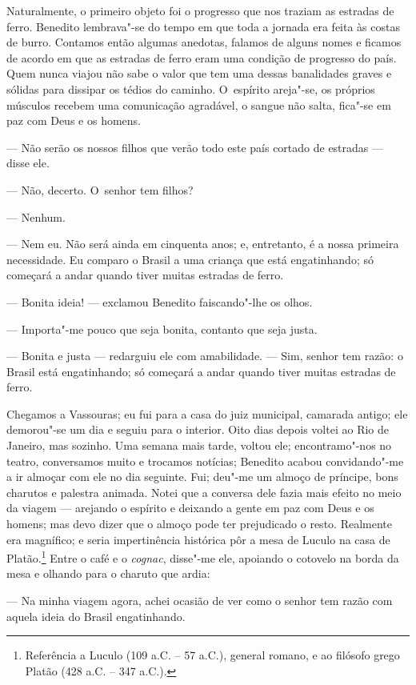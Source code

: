 \begin{linenumbers}
Naturalmente, o primeiro objeto foi o progresso que nos traziam as
estradas de ferro. Benedito lembrava"-se do tempo em que toda a jornada
era feita às costas de burro. Contamos então algumas anedotas, falamos
de alguns nomes e ficamos de acordo em que as estradas de ferro eram uma
condição de progresso do país. Quem nunca viajou não sabe o valor que
tem uma dessas banalidades graves e sólidas para dissipar os tédios do
caminho. O~espírito areja"-se, os próprios músculos recebem uma
comunicação agradável, o sangue não salta, fica"-se em paz com Deus e os
homens.

--- Não serão os nossos filhos que verão todo este país cortado de
estradas --- disse ele.

--- Não, decerto. O~senhor tem filhos?

--- Nenhum.

--- Nem eu. Não será ainda em cinquenta anos; e, entretanto, é a nossa
primeira necessidade. Eu comparo o Brasil a uma criança que está
engatinhando; só começará a andar quando tiver muitas estradas de ferro.

--- Bonita ideia! --- exclamou Benedito faiscando"-lhe os olhos.

--- Importa"-me pouco que seja bonita, contanto que seja justa.

--- Bonita e justa --- redarguiu ele com amabilidade. --- Sim, senhor tem
razão: o Brasil está engatinhando; só começará a andar quando tiver
muitas estradas de ferro.

Chegamos a Vassouras; eu fui para a casa do juiz municipal, camarada
antigo; ele demorou"-se um dia e seguiu para o interior. Oito dias depois
voltei ao Rio de Janeiro, mas sozinho. Uma semana mais tarde, voltou
ele; encontramo"-nos no teatro, conversamos muito e trocamos notícias;
Benedito acabou convidando"-me a ir almoçar com ele no dia seguinte. Fui;
deu"-me um almoço de príncipe, bons charutos e palestra animada. Notei
que a conversa dele fazia mais efeito no meio da viagem --- arejando o
espírito e deixando a gente em paz com Deus e os homens; mas devo dizer
que o almoço pode ter prejudicado o resto. Realmente era magnífico; e
seria impertinência histórica pôr a mesa de Luculo na casa de
Platão.\footnote{Referência a Luculo (109 a.C. -- 57 a.C.), general
  romano, e ao filósofo grego Platão (428 a.C. -- 347 a.C.).} Entre o
café e o \emph{cognac}, disse"-me ele, apoiando o cotovelo na borda da
mesa e olhando para o charuto que ardia:

--- Na minha viagem agora, achei ocasião de ver como o senhor tem razão
com aquela ideia do Brasil engatinhando.


\end{linenumbers}
